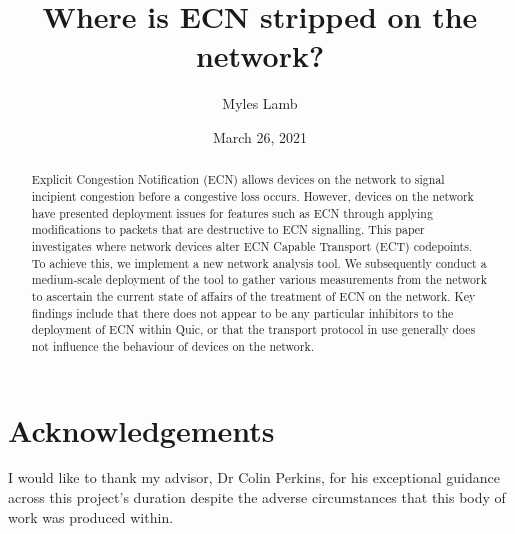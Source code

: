 \documentclass{l4proj}
\begin{document}
\title{Where is ECN stripped on the network?}
\author{Myles Lamb}
\date{March 26, 2021}

\maketitle

\begin{abstract}
    
 Explicit Congestion Notification (ECN) allows devices on the network to signal incipient congestion before a congestive loss occurs. However, devices on the network have presented deployment issues for features such as ECN through applying modifications to packets that are destructive to ECN signalling. This paper investigates where network devices alter ECN Capable Transport (ECT) codepoints. To achieve this, we implement a new network analysis tool. We subsequently conduct a medium-scale deployment of the tool to gather various measurements from the network to ascertain the current state of affairs of the treatment of ECN on the network. Key findings include that there does not appear to be any particular inhibitors to the deployment of ECN within Quic, or that the transport protocol in use generally does not influence the behaviour of devices on the network.
    
\end{abstract}

\chapter*{Acknowledgements}

I would like to thank my advisor, Dr Colin Perkins, for his exceptional guidance across this project's duration despite the adverse circumstances that this body of work was produced within.


\def\consentname {Myles Lamb} %
\def\consentdate {26 March 2021} %

\educationalconsent


\tableofcontents
\end{document}
